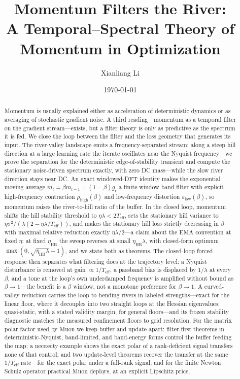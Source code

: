 \documentclass[11pt,a4paper]{article}
\title{Momentum Filters the River:\\ A Temporal--Spectral Theory of Momentum in Optimization}
\author[1]{Xianliang Li}
\affil[1]{The Institute of Statistical Mathematics}
\affil[ ]{\href{mailto:yinleung.ley@gmail.com}{yinleung.ley@gmail.com}}
\date{\today}
\theoremstyle{remark}
\newcommand{\Teff}{T_{\mathrm{eff}}}
\newcommand{\rhohigh}{\rho_{\mathrm{high}}}
\newcommand{\epslow}{\varepsilon_{\mathrm{low}}}
\begin{document}
\maketitle

\begin{abstract}
Momentum is usually explained either as acceleration of deterministic dynamics or as averaging of stochastic gradient noise.
A third reading---momentum as a temporal filter on the gradient stream---exists, but a filter theory is only as predictive as the spectrum it is fed.
We close the loop between the filter and the loss geometry that generates its input.
The river-valley landscape emits a frequency-separated stream: along a steep hill direction at a large learning rate the iterate oscillates near the Nyquist frequency---we prove the separation for the deterministic edge-of-stability transient and compute the stationary noise-driven spectrum exactly, with zero DC mass---while the slow river direction stays near DC.
An exact windowed-DFT identity makes the exponential moving average $m_t=\beta m_{t-1}+(1-\beta)g_t$ a finite-window band filter with explicit high-frequency contraction $\rhohigh(\beta)$ and low-frequency distortion $\epslow(\beta)$, so momentum raises the river-to-hill ratio of the buffer.
In the closed loop, momentum shifts the hill stability threshold to $\eta\lambda<2\Teff$, sets the stationary hill variance to $\eta\sigma^2/(\lambda(2-\eta\lambda/\Teff))$, and makes the stationary hill loss strictly decreasing in $\beta$ with maximal relative reduction exactly $\eta\lambda/2$---a claim about the EMA convention at fixed $\eta$: at fixed $\eta_{\mathrm{HB}}$ the sweep reverses at small $\eta_{\mathrm{HB}}\lambda$, with closed-form optimum $\max(0,\sqrt{\eta_{\mathrm{HB}}\lambda}-1)$, and we state both as theorems.
The closed-loop forced response then separates what filtering does at the trajectory level: a Nyquist disturbance is removed at gain $\propto1/\Teff$, a passband bias is displaced by $1/\lambda$ at every $\beta$, and a tone at the loop's own underdamped frequency is amplified without bound as $\beta\to1$---the benefit is a $\beta$ window, not a monotone preference for $\beta\to1$.
A curved-valley reduction carries the loop to bending rivers in labeled strengths---exact for the linear floor, where it decouples into two straight loops at the Hessian eigenvalues; quasi-static, with a stated validity margin, for general floors---and its frozen stability diagnostic matches the measured confinement floors to grid resolution.
For the matrix polar factor used by Muon we keep buffer and update apart: filter-first theorems in deterministic-Nyquist, band-limited, and band-energy forms control the buffer feeding the map; a necessity example shows the exact polar of a rank-deficient signal transfers none of that control; and two update-level theorems recover the transfer at the same $1/\Teff$ rate---for the exact polar under a full-rank signal, and for the finite Newton--Schulz operator practical Muon deploys, at an explicit Lipschitz price.

\end{abstract}
\end{document}
